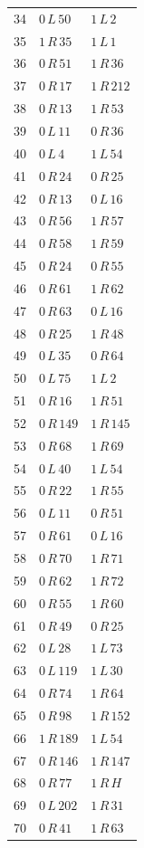 \begin{longtable}{rll}
34 & $0\,L\,50$ & $1\,L\,2$ \\
35 & $1\,R\,35$ & $1\,L\,1$ \\
36 & $0\,R\,51$ & $1\,R\,36$ \\
37 & $0\,R\,17$ & $1\,R\,212$ \\
38 & $0\,R\,13$ & $1\,R\,53$ \\
39 & $0\,L\,11$ & $0\,R\,36$ \\
40 & $0\,L\,4$ & $1\,L\,54$ \\
41 & $0\,R\,24$ & $0\,R\,25$ \\
42 & $0\,R\,13$ & $0\,L\,16$ \\
43 & $0\,R\,56$ & $1\,R\,57$ \\
44 & $0\,R\,58$ & $1\,R\,59$ \\
45 & $0\,R\,24$ & $0\,R\,55$ \\
46 & $0\,R\,61$ & $1\,R\,62$ \\
47 & $0\,R\,63$ & $0\,L\,16$ \\
48 & $0\,R\,25$ & $1\,R\,48$ \\
49 & $0\,L\,35$ & $0\,R\,64$ \\
50 & $0\,L\,75$ & $1\,L\,2$ \\
51 & $0\,R\,16$ & $1\,R\,51$ \\
52 & $0\,R\,149$ & $1\,R\,145$ \\
53 & $0\,R\,68$ & $1\,R\,69$ \\
54 & $0\,L\,40$ & $1\,L\,54$ \\
55 & $0\,R\,22$ & $1\,R\,55$ \\
56 & $0\,L\,11$ & $0\,R\,51$ \\
57 & $0\,R\,61$ & $0\,L\,16$ \\
58 & $0\,R\,70$ & $1\,R\,71$ \\
59 & $0\,R\,62$ & $1\,R\,72$ \\
60 & $0\,R\,55$ & $1\,R\,60$ \\
61 & $0\,R\,49$ & $0\,R\,25$ \\
62 & $0\,L\,28$ & $1\,L\,73$ \\
63 & $0\,L\,119$ & $1\,L\,30$ \\
64 & $0\,R\,74$ & $1\,R\,64$ \\
65 & $0\,R\,98$ & $1\,R\,152$ \\
66 & $1\,R\,189$ & $1\,L\,54$ \\
67 & $0\,R\,146$ & $1\,R\,147$ \\
68 & $0\,R\,77$ & $1\,R\,H$ \\
69 & $0\,L\,202$ & $1\,R\,31$ \\
70 & $0\,R\,41$ & $1\,R\,63$ \\

\end{longtable}
